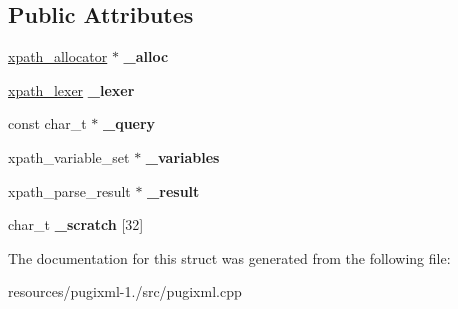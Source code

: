 \subsection*{Public Attributes}
\begin{DoxyCompactItemize}
\item 
\hypertarget{structxpath__parser_ac34f5b21ef406bec944286eee2f45836}{\hyperlink{classxpath__allocator}{xpath\+\_\+allocator} $\ast$ {\bfseries \+\_\+alloc}}\label{structxpath__parser_ac34f5b21ef406bec944286eee2f45836}

\item 
\hypertarget{structxpath__parser_a50106db584946e67acd080ef5391a0f4}{\hyperlink{classxpath__lexer}{xpath\+\_\+lexer} {\bfseries \+\_\+lexer}}\label{structxpath__parser_a50106db584946e67acd080ef5391a0f4}

\item 
\hypertarget{structxpath__parser_aaf5ea5d5be97cdd93adc7a719d8edc1c}{const char\+\_\+t $\ast$ {\bfseries \+\_\+query}}\label{structxpath__parser_aaf5ea5d5be97cdd93adc7a719d8edc1c}

\item 
\hypertarget{structxpath__parser_a3e0adfea7cc81c08b97ee1375831df6c}{xpath\+\_\+variable\+\_\+set $\ast$ {\bfseries \+\_\+variables}}\label{structxpath__parser_a3e0adfea7cc81c08b97ee1375831df6c}

\item 
\hypertarget{structxpath__parser_a9370fb875bfc49ca6e35f3165ecb1692}{xpath\+\_\+parse\+\_\+result $\ast$ {\bfseries \+\_\+result}}\label{structxpath__parser_a9370fb875bfc49ca6e35f3165ecb1692}

\item 
\hypertarget{structxpath__parser_aa9180a17c8ec28977928c815c3425a79}{char\+\_\+t {\bfseries \+\_\+scratch} \mbox{[}32\mbox{]}}\label{structxpath__parser_aa9180a17c8ec28977928c815c3425a79}

\end{DoxyCompactItemize}


The documentation for this struct was generated from the following file\+:\begin{DoxyCompactItemize}
\item 
resources/pugixml-\/1./src/pugixml.\+cpp\end{DoxyCompactItemize}
